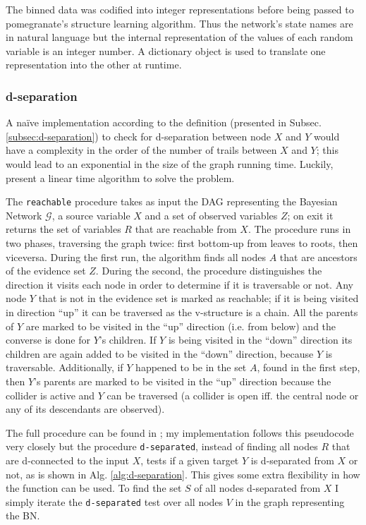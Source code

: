 The binned data was codified into integer representations before being passed to pomegranate's structure learning algorithm.
Thus the network's state names are in natural language but the internal representation of the values of each random variable is an integer number.
A dictionary object is used to translate one representation into the other at runtime.

\subsubsection{d-separation}
A na{\"i}ve implementation according to the definition (presented in Subsec. \ref{subsec:d-separation}) to check for d-separation between node $X$ and $Y$ would have a complexity in the order of the number of trails between $X$ and $Y$; this would lead to an exponential in the size of the graph running time.
Luckily, \cite{koller2007dseparation} present a linear time algorithm to solve the problem.

The \texttt{reachable} procedure takes as input the DAG representing the Bayesian Network $\mathcal{G}$, a source variable $X$ and a set of observed variables $Z$; on exit it returns the set of variables $R$ that are reachable from $X$.
The procedure runs in two phases, traversing the graph twice: first bottom-up from leaves to roots, then viceversa.
During the first run, the algorithm finds all nodes $A$ that are ancestors of the evidence set $Z$.
During the second, the procedure distinguishes the direction it visits each node in order to determine if it is traversable or not.
Any node $Y$ that is not in the evidence set is marked as reachable; if it is being visited in direction \enquote{up} it can be traversed as the v-structure is a chain.
All the parents of $Y$ are marked to be visited in the \enquote{up} direction (i.e. from below) and the converse is done for $Y$'s children.
If $Y$ is being visited in the \enquote{down} direction its children are again added to be visited in the \enquote{down} direction, because $Y$ is traversable.
Additionally, if $Y$ happened to be in the set $A$, found in the first step, then $Y$'s parents are marked to be visited in the \enquote{up} direction because the collider is active and $Y$ can be traversed (a collider is open iff. the central node or any of its descendants are observed).

The full procedure can be found in \cite{koller2007dseparation}; my implementation follows this pseudocode very closely but the procedure \texttt{d-separated}, instead of finding all nodes $R$ that are d-connected to the input $X$, tests if a given target $Y$ is d-separated from $X$ or not, as is shown in Alg. \ref{alg:d-separation}.
This gives some extra flexibility in how the function can be used.
To find the set $S$ of all nodes d-separated from $X$ I simply iterate the \texttt{d-separated} test over all nodes $V$ in the graph representing the BN.

